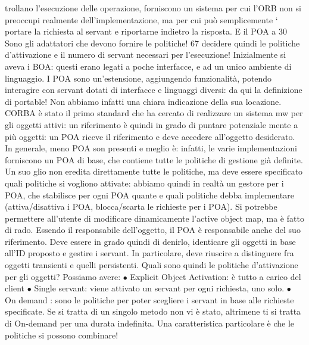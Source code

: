trollano l'esecuzione delle operazione, forniscono un sistema per cui l'ORB non
si preoccupi realmente dell'implementazione, ma per cui può semplicemente
`
portare la richiesta al servant e riportarne indietro la risposta. E il POA a
30 Sono
gli adattatori che devono fornire le politiche!
67
decidere quindi le politiche d'attivazione e il numero di servant necessari per
l'esecuzione!
Inizialmente si aveva i BOA: questi erano legati a poche interfacce, e ad un
unico ambiente di linguaggio. I POA sono un'estensione, aggiungendo funzionalità, potendo interagire con servant dotati
di interfacce e linguaggi diversi: da
qui la definizione di portable! Non abbiamo infatti una chiara indicazione della
sua locazione.
CORBA è stato il primo standard che ha cercato di realizzare un sistema
mw per gli oggetti attivi: un riferimento è quindi in grado di puntare potenziale
mente a più oggetti: un POA riceve il riferimento e deve accedere all'oggetto
desiderato. In generale, meno POA son presenti e meglio è: infatti, le varie
implementazioni forniscono un POA di base, che contiene tutte le politiche di
gestione già definite. Un suo glio non eredita direttamente tutte le politiche, ma
deve essere specificato quali politiche si vogliono attivate: abbiamo quindi in realtà un gestore per i POA, che
stabilisce per ogni POA quante e quali politiche
debba implementare (attiva/disattiva i POA, blocca/scarta le richieste per i
POA). Si potrebbe permettere all'utente di modificare dinamicamente l'active
object map, ma è fatto di rado.
Essendo il responsabile dell'oggetto, il POA è responsabile anche del suo
riferimento. Deve essere in grado quindi di denirlo, identicare gli oggetti in
base all'ID proposto e gestire i servant. In particolare, deve riuscire a distinguere
fra oggetti transienti e quelli persistenti.
Quali sono quindi le politiche d'attivazione per gli oggetti? Possiamo avere:
$\bullet$ Explicit Object Activation: è tutto a carico del client
$\bullet$ Single servant: viene attivato un servant per ogni richiesta, uno solo.
$\bullet$ On demand : sono le politiche per poter scegliere i servant in base alle richieste specificate. Se si tratta di
un singolo metodo non vi è stato, altrimene
ti si tratta di On-demand per una durata indefinita. Una caratteristica
particolare è che le politiche si possono combinare!
